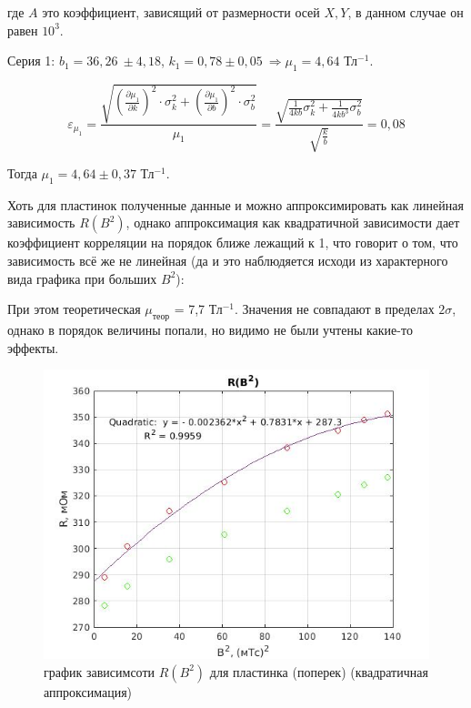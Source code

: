 \documentclass[a4paper, 12pt]{article}%
\begin{document}
где $A$ это коэффициент, зависящий от размерности осей $X,Y$, в данном случае он равен $10^{3}$.

Серия 1: $b_1 = 36,26\ \pm 4,18$, $k_1 = 0,78 \pm 0,05\ \Rightarrow \mu_1 = 4,64$ Тл$^{-1}$.

\[ \varepsilon_{\mu_1} = \frac{\sqrt{ (\frac{\partial \mu_1}{\partial k}) ^2 \cdot \sigma^2_{k} + (\frac{\partial \mu_1}{\partial b}) ^2 \cdot \sigma^2_{b}  }}{\mu_1} = \frac{\sqrt{  \frac{1}{4kb} \sigma^2_{k} + \frac{1}{4kb^3} \sigma^2_{b} }}{\sqrt{\frac{k}{b}}} = 0,08\]

Тогда $\mu_1 = 4,64 \pm 0,37$ Тл$^{-1}$.



Хоть для пластинок полученные данные и можно аппроксимировать как линейная зависимость $R(B^2)$, однако аппроксимация как квадратичной зависимости дает коэффициент корреляции на порядок ближе лежащий к 1, что говорит о том, что зависимость всё же не линейная (да и это наблюдяется исходи из характерного вида графика при больших $B^2$):

При этом теоретическая $\mu_{\text{теор}}$ = 7,7 Тл$^{-1}$. Значения не совпадают в пределах $2\sigma$, однако в порядок величины попали, но видимо не были учтены какие-то эффекты.

\newpage

\begin{center}
\begin{figure}[!h]
    \centering
    \includegraphics[width = 10 cm]{graph2(no_disk)(quadratic_1).jpg}
    \caption{график зависимсоти $R(B^2)$ для пластинка (поперек) (квадратичная аппроксимация)}
    \label{ser2_q}
\end{figure}
\end{center}
\end{document}
